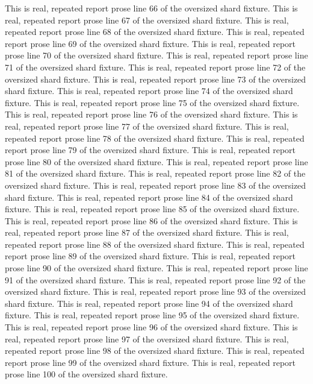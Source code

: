 This is real, repeated report prose line 66 of the oversized shard fixture.
This is real, repeated report prose line 67 of the oversized shard fixture.
This is real, repeated report prose line 68 of the oversized shard fixture.
This is real, repeated report prose line 69 of the oversized shard fixture.
This is real, repeated report prose line 70 of the oversized shard fixture.
This is real, repeated report prose line 71 of the oversized shard fixture.
This is real, repeated report prose line 72 of the oversized shard fixture.
This is real, repeated report prose line 73 of the oversized shard fixture.
This is real, repeated report prose line 74 of the oversized shard fixture.
This is real, repeated report prose line 75 of the oversized shard fixture.
This is real, repeated report prose line 76 of the oversized shard fixture.
This is real, repeated report prose line 77 of the oversized shard fixture.
This is real, repeated report prose line 78 of the oversized shard fixture.
This is real, repeated report prose line 79 of the oversized shard fixture.
This is real, repeated report prose line 80 of the oversized shard fixture.
This is real, repeated report prose line 81 of the oversized shard fixture.
This is real, repeated report prose line 82 of the oversized shard fixture.
This is real, repeated report prose line 83 of the oversized shard fixture.
This is real, repeated report prose line 84 of the oversized shard fixture.
This is real, repeated report prose line 85 of the oversized shard fixture.
This is real, repeated report prose line 86 of the oversized shard fixture.
This is real, repeated report prose line 87 of the oversized shard fixture.
This is real, repeated report prose line 88 of the oversized shard fixture.
This is real, repeated report prose line 89 of the oversized shard fixture.
This is real, repeated report prose line 90 of the oversized shard fixture.
This is real, repeated report prose line 91 of the oversized shard fixture.
This is real, repeated report prose line 92 of the oversized shard fixture.
This is real, repeated report prose line 93 of the oversized shard fixture.
This is real, repeated report prose line 94 of the oversized shard fixture.
This is real, repeated report prose line 95 of the oversized shard fixture.
This is real, repeated report prose line 96 of the oversized shard fixture.
This is real, repeated report prose line 97 of the oversized shard fixture.
This is real, repeated report prose line 98 of the oversized shard fixture.
This is real, repeated report prose line 99 of the oversized shard fixture.
This is real, repeated report prose line 100 of the oversized shard fixture.

